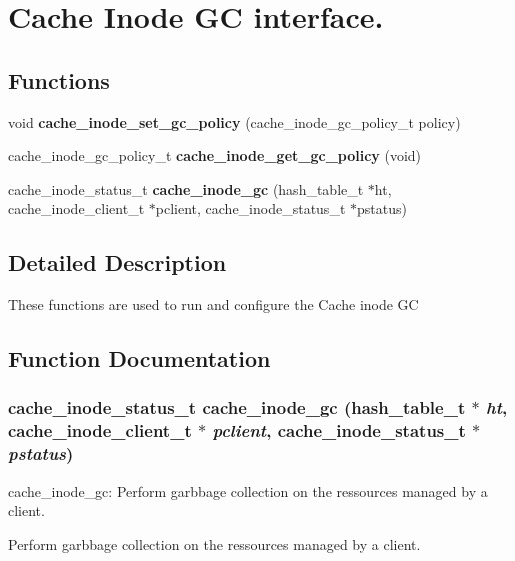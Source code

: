 \section{Cache Inode GC interface.}
\label{group__Cache__inode__gc__interface}
\subsection*{Functions}
\begin{CompactItemize}
\item 
void {\bf cache\_\-inode\_\-set\_\-gc\_\-policy} (cache\_\-inode\_\-gc\_\-policy\_\-t policy)
\item 
cache\_\-inode\_\-gc\_\-policy\_\-t {\bf cache\_\-inode\_\-get\_\-gc\_\-policy} (void)
\item 
cache\_\-inode\_\-status\_\-t {\bf cache\_\-inode\_\-gc} (hash\_\-table\_\-t $\ast$ht, cache\_\-inode\_\-client\_\-t $\ast$pclient, cache\_\-inode\_\-status\_\-t $\ast$pstatus)
\end{CompactItemize}


\subsection{Detailed Description}
These functions are used to run and configure the Cache inode GC 

\subsection{Function Documentation}
\subsubsection[{cache\_\-inode\_\-gc}]{\setlength{\rightskip}{0pt plus 5cm}cache\_\-inode\_\-status\_\-t cache\_\-inode\_\-gc (hash\_\-table\_\-t $\ast$ {\em ht}, \/  cache\_\-inode\_\-client\_\-t $\ast$ {\em pclient}, \/  cache\_\-inode\_\-status\_\-t $\ast$ {\em pstatus})}\label{group__Cache__inode__gc__interface_g2c07f75a5a24f519e42b34e8718bf79b}


cache\_\-inode\_\-gc: Perform garbbage collection on the ressources managed by a client.

Perform garbbage collection on the ressources managed by a client.


